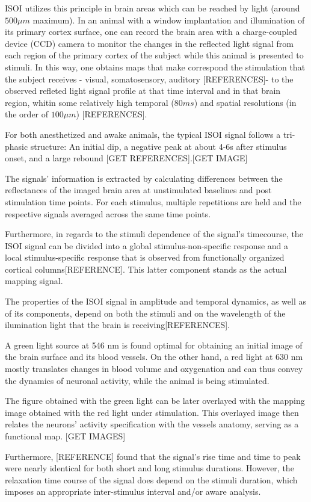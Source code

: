 ISOI utilizes this principle in brain areas which can be reached by light (around $500 \mu m$ maximum). In an animal with a window implantation and illumination of its primary cortex surface, one can record the brain area with a charge-coupled device (CCD) camera to monitor the changes in the reflected light signal from each region of the primary cortex of the subject while this animal is presented to stimuli. In this way, one obtains maps that make correspond the stimulation that the subject receives - visual, somatosensory, auditory [REFERENCES]- to the observed refleted light signal profile at that time interval and in that brain region, whitin some relatively high temporal ($80 ms$) and spatial resolutions (in the order of $100 \mu m$) [REFERENCES].

For both anesthetized and awake animals, the typical ISOI signal follows a tri-phasic structure: An initial dip, a negative peak at about 4-6s after stimulus onset, and a large rebound [GET REFERENCES].[GET IMAGE] 

The signals' information is extracted by calculating differences between the reflectances of the imaged brain area at unstimulated baselines and post stimulation time points. For each stimulus, multiple repetitions are held and the respective signals averaged across the same time points.

Furthermore, in regards to the stimuli dependence of the signal's timecourse, the ISOI signal can be divided into a global stimulus-non-specific response and a local stimulus-specific response that is observed from functionally organized cortical columns[REFERENCE]. This latter component stands as the actual mapping signal. 

The properties of the ISOI signal in amplitude and temporal dynamics, as well as of its components, depend on both the stimuli and on the wavelength of the ilumination light that the brain is receiving[REFERENCES].

A green light source at 546 nm is found optimal for obtaining an initial image of the brain surface and its blood vessels. On the other hand, a red light at 630 nm mostly translates changes in blood volume and oxygenation and can thus convey the dynamics of neuronal activity, while the animal is being stimulated. 

The figure obtained with the green light can be later overlayed with the mapping image obtained with the red light under stimulation. This overlayed image then relates the neurons' activity specification with the vessels anatomy, serving as a functional map. [GET IMAGES]

Furthermore, [REFERENCE] found that the signal's rise time and time to peak were nearly identical for both short and long stimulus durations. However, the  relaxation time course of the signal does depend on the stimuli duration, which imposes an appropriate inter-stimulus interval and/or aware analysis.